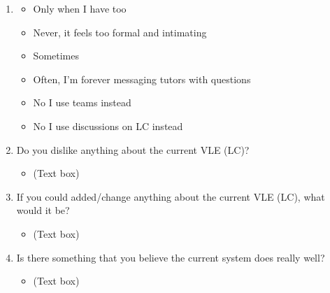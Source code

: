 \begin{enumerate}
    \item \textbf{}
    \begin{itemize}
        \item Only when I have too
        \item Never, it feels too formal and intimating
        \item Sometimes
        \item Often, I'm forever messaging tutors with questions
        \item No I use teams instead
        \item No I use discussions on LC instead 
    \end{itemize}
    
    \item Do you dislike anything about the current VLE (LC)?
    \begin{itemize}
        \item (Text box) 
    \end{itemize}
    
    \item If you could added/change anything about the current VLE (LC), what would it be?
    \begin{itemize}
        \item (Text box) 
    \end{itemize}
    
    \item Is there something that you believe the current system does really well?
    \begin{itemize}
        \item (Text box) 
    \end{itemize}
\end{enumerate}